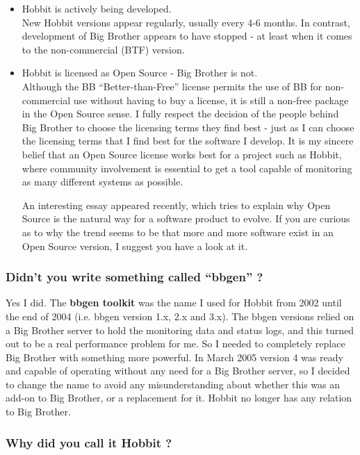 \begin{itemize}
\item Hobbit is actively being developed.\\ 


 New Hobbit versions appear regularly, usually every 4-6 months. In contrast, development of Big Brother appears to have stopped - at least when it comes to the non-commercial (BTF) version.

\item Hobbit is licensed as Open Source - Big Brother is not.\\ 


 Although the BB ``Better-than-Free'' license permits the use of BB for non-commercial use without having to buy a license, it is still a non-free package in the Open Source sense. I fully respect the decision of the people behind Big Brother to choose the licensing terms they find best - just as I can choose the licensing terms that I find best for the software I develop. It is my sincere belief that an Open Source license works best for a project such as Hobbit, where community involvement is essential to get a tool capable of monitoring as many different systems as possible.


 An interesting essay appeared recently, which tries to explain why Open Source is the natural way for a software product to evolve. If you are curious as to why the trend seems to be that more and more software exist in an Open Source version, I suggest you have a look at it.


\end{itemize}
\subsubsection{Didn't you write something called ``bbgen'' ?}


 Yes I did. The \textbf{bbgen toolkit}
 was the name I used for Hobbit from 2002 until the end of 2004 (i.e. bbgen version 1.x, 2.x and 3.x). The bbgen versions relied on a Big Brother server to hold the monitoring data and status logs, and this turned out to be a real performance problem for me. So I needed to completely replace Big Brother with something more powerful. In March 2005 version 4 was ready and capable of operating without any need for a Big Brother server, so I decided to change the name to avoid any misunderstanding about whether this was an add-on to Big Brother, or a replacement for it. Hobbit no longer has any relation to Big Brother.
\subsubsection{Why did you call it Hobbit ?}


